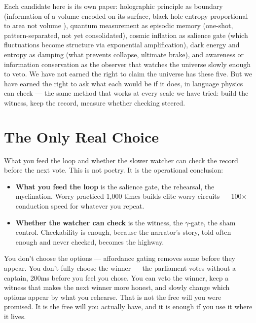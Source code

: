 \documentclass[11pt]{article}
\begin{document}
Each candidate here is its own paper: holographic principle as boundary (information of a volume encoded on its surface, black hole entropy proportional to area not volume \citep{maturana1980}), quantum measurement as episodic memory (one-shot, pattern-separated, not yet consolidated), cosmic inflation as salience gate (which fluctuations become structure via exponential amplification), dark energy and entropy as damping (what prevents collapse, ultimate brake), and awareness or information conservation as the observer that watches the universe slowly enough to veto. We have not earned the right to claim the universe has these five. But we have earned the right to ask what each would be if it does, in language physics can check --- the same method that works at every scale we have tried: build the witness, keep the record, measure whether checking steered.

\section{The Only Real Choice}
\label{sec:choice}

What you feed the loop and whether the slower watcher can check the record before the next vote. This is not poetry. It is the operational conclusion:

\begin{itemize}
\item \textbf{What you feed the loop} is the salience gate, the rehearsal, the myelination. Worry practiced 1,000 times builds elite worry circuits --- 100$\times$ conduction speed for whatever you repeat.
\item \textbf{Whether the watcher can check} is the witness, the $\gamma$-gate, the sham control. Checkability is enough, because the narrator's story, told often enough and never checked, becomes the highway.
\end{itemize}

You don't choose the options --- affordance gating removes some before they appear. You don't fully choose the winner --- the parliament votes without a captain, 200ms before you feel you chose. You can veto the winner, keep a witness that makes the next winner more honest, and slowly change which options appear by what you rehearse. That is not the free will you were promised. It is the free will you actually have, and it is enough if you use it where it lives.
\end{document}
